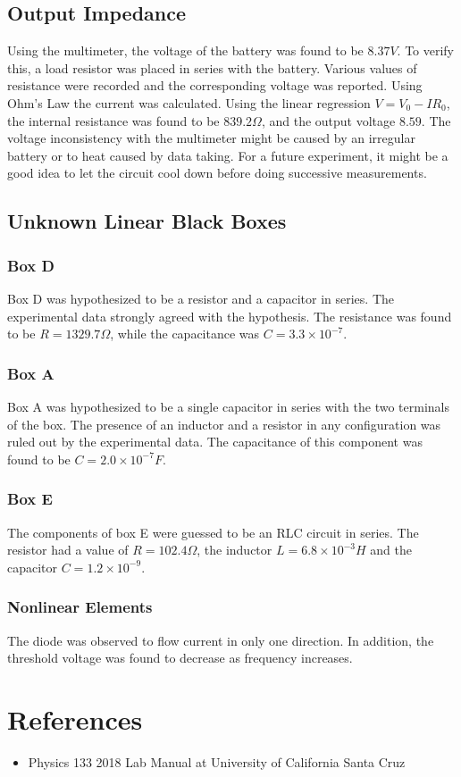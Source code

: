 \documentclass[a4paper]{article}
\begin{document}
\subsection{Output Impedance}
Using the multimeter, the  voltage of the battery was found to be $8.37V$. To verify this, a load resistor was placed in series with the battery. Various values of resistance were recorded and the corresponding voltage was reported. Using Ohm's Law the current was calculated. Using the linear regression $V=V_0-IR_0$, the internal resistance was found to be $839.2\Omega$, and the output voltage $8.59$. The voltage inconsistency with the multimeter might be caused by an irregular battery or to heat caused by data taking. For a future experiment, it might be a good idea to let the circuit cool down before doing successive measurements.
\subsection{Unknown Linear Black Boxes}
\subsubsection{Box D}
Box D was hypothesized to be a resistor and a capacitor in series. The experimental data strongly agreed with the hypothesis. The resistance was found to be $R=1329.7\Omega$, while the capacitance was $C=3.3\times 10^{-7}$.
\subsubsection{Box A}
Box A was hypothesized to be a single capacitor in series with the two terminals of the box. The presence of an inductor and a resistor in any configuration was ruled out by the experimental data. The capacitance of this component was found to be $C=2.0\times 10^{-7}F$. 
\subsubsection{Box E}
The components of box E were guessed to be an RLC circuit in series. The resistor had a value of $R=102.4\Omega$, the inductor $L=6.8\times 10^{-3}H$ and the capacitor $C=1.2\times 10^{-9}$.
\subsubsection{Nonlinear Elements}
The diode was observed to flow current in only one direction. In addition, the threshold voltage was found to decrease as frequency increases.
\clearpage
\section{References}
\begin{itemize}
\item Physics 133 2018 Lab Manual at University of California Santa Cruz
\end{itemize}







  
  
\end{document}

